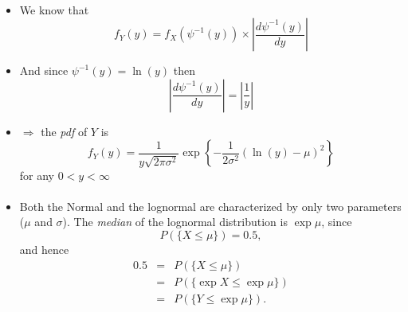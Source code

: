 \documentclass[smaller]{beamer}\usepackage[]{graphicx}\usepackage[]{color}
\renewcommand{\Pr}{P}
\begin{document}
\begin{frame}{\secname}
  \framesubtitle{\subsecname}
  \begin{example}[continued]
  \begin{footnotesize}
  \begin{itemize}
  \item We know that
  \begin{equation*}
  f_{Y}\left( y\right) =f_{X}\left( \psi ^{-1}\left( y\right) \right) \times
  \left\vert \frac{d\psi ^{-1}\left( y\right) }{dy}\right\vert
  \end{equation*}

  \item And since $\psi ^{-1}\left( y\right) =\ln (y)$ then
  \begin{equation*}
  \left\vert \frac{d\psi ^{-1}\left( y\right) }{dy}\right\vert =\left\vert
  \frac{1}{y}\right\vert
  \end{equation*}

  \item $\Rightarrow $ the \emph{pdf} of $Y$ is
  \begin{equation*}
  f_{Y}\left( y\right) =\frac{1}{y\sqrt{2\pi \sigma ^{2}}}\exp{ \left\{ -\frac{1%
  }{2\sigma ^{2}}\left( \ln (y)-\mu \right) ^{2}\right\}}
  \end{equation*}
  for any $0<y<\infty $
  \end{itemize}
  \end{footnotesize}
  \end{example}
\end{frame}

\begin{frame}{\secname}
\framesubtitle{\subsecname}
  \begin{example}[continued]
  \begin{footnotesize}
  \begin{itemize}
  \item Both the Normal and the lognormal are characterized by
  only two parameters ($\mu$ and $\sigma$). The \emph{median} of the lognormal distribution is $\exp{
  \mu } $, since $$
  \Pr \left( \{ X\leq \mu \} \right) = 0.5,
  $$
  and hence%
  \begin{eqnarray*}
  0.5 &=&\Pr \left(\{ X\leq \mu \}\right) \\
  &=&\Pr \left( \{\exp{X} \leq \exp{ \mu }\} \right) \\
  &=&\Pr \left( \{Y\leq \exp{ \mu }\} \right).
  \end{eqnarray*}
  \end{itemize}
  \end{footnotesize}
  \end{example}
\end{frame}
\end{document}
